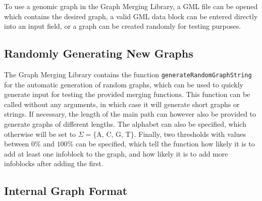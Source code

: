 \documentclass[a4paper,12pt,twoside,BCOR=10mm]{scrbook}
\begin{document}
To use a genomic graph in the Graph Merging Library, 
a GML file can be opened which contains the desired graph, 
a valid GML data block can be entered directly into an input field, 
or a graph can be created randomly for testing purposes.

\subsection{Randomly Generating New Graphs}

The Graph Merging Library contains the function \texttt{generateRandomGraphString} for 
the automatic generation of random graphs, which can be used to quickly generate input for testing the 
provided merging functions. 
This function can be called without any arguments, in which case it will generate short graphs 
or strings. If necessary, the length of the main path can however also be provided to generate 
graphs of different lengths. The alphabet can also be specified, which otherwise will be 
set to $ \Sigma = \{ \textrm{A, C, G, T} \} $. Finally, two thresholds with values between $ 0\% $ and $ 100\% $ can 
be specified, which tell the function how likely it is to add at least one infoblock to the graph, 
and how likely it is to add more infoblocks after adding the first.


\subsection{Internal Graph Format}
\label{sec:internal_graph_format}
\end{document}
